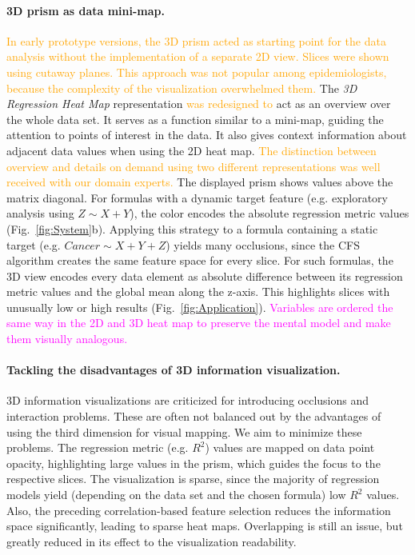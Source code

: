 \documentclass[journal]{style/vgtc} 			          %
\newcommand{\design}[1]{\textcolor{orange}{#1}}
\newcommand{\magenta}[1]{\textcolor{magenta}{#1}}
\begin{document}
\paragraph{3D prism as data mini-map.}
\design{
In early prototype versions, the 3D prism acted as starting point for the data analysis without the implementation of a separate 2D view.
Slices were shown using cutaway planes.
This approach was not popular among epidemiologists, because the complexity of the visualization overwhelmed them. %
}
The \emph{3D Regression Heat Map} representation \design{was redesigned to} act as an overview over the whole data set.
It serves as a function similar to a mini-map, guiding the attention to points of interest in the data.
It also gives context information about adjacent data values when using the 2D heat map.
\design{The distinction between overview and details on demand using two different representations was well received with our domain experts.}
The displayed prism shows values above the matrix diagonal.
For formulas with a dynamic target feature (e.g. exploratory analysis using $Z \sim X + Y$), the color encodes the absolute regression metric values (Fig.~\ref{fig:System}b).
Applying this strategy to a formula containing a static target (e.g. $Cancer \sim X + Y + Z$) yields many occlusions, since the CFS algorithm creates the same feature space for every slice.
For such formulas, the 3D view encodes every data element as absolute difference between its regression metric values and the global mean along the z-axis.
This highlights slices with unusually low or high results (Fig.~\ref{fig:Application}).
\magenta{Variables are ordered the same way in the 2D and 3D heat map to preserve the mental model and make them visually analogous.}

\paragraph{Tackling the disadvantages of 3D information visualization.}
3D information visualizations are criticized for introducing occlusions and interaction problems.
These are often not balanced out by the advantages of using the third dimension for visual mapping.
We aim to minimize these problems.
The regression metric (e.g. $R^2$) values are mapped on data point opacity, highlighting large values in the prism, which guides the focus to the respective slices.
The visualization is sparse, since the majority of regression models yield (depending on the data set and the chosen formula) low $R^2$ values.
Also, the preceding correlation-based feature selection reduces the information space significantly, leading to sparse heat maps.
Overlapping is still an issue, but greatly reduced in its effect to the visualization readability.
\end{document}
